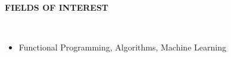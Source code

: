 \documentclass[a4paper,10pt]{article}
\newcommand{\lsep}{-0.5cm}
\newcommand{\resheading}[1]{{\small \colorbox{mygrey}{\begin{minipage}{0.975\textwidth}{\textbf{#1 \vphantom{p\^{E}}}}\end{minipage}}}}
\begin{document}
\hspace{0.5cm}\\[-0.2cm]

\vspace{4.8cm}


\resheading{\textbf{FIELDS OF INTEREST} }\\[\lsep]
\begin{itemize}
\item \noindent Functional Programming, Algorithms, Machine Learning
\end{itemize}
\end{document}
